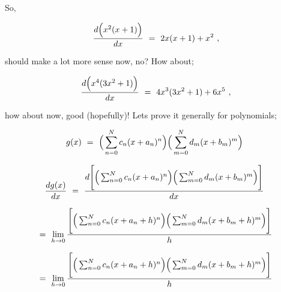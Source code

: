 \documentclass{article}
\begin{document}
So,

\begin{equation} \label{eb-eq-327-1}
\frac{d \Big( x^2(x + 1)\Big)}{dx} \hspace{0.125cm} = \hspace{0.125cm} 2x(x + 1) + x^2 \hspace{0.125cm} ,
\end{equation}

should make a lot more sense now, no? How about;

\begin{equation} \label{eb-eq-327-2}
\frac{d \Big( x^4(3x^2 + 1)\Big)}{dx} \hspace{0.125cm} = \hspace{0.125cm} 4x^3 (3x^2 + 1) + 6 x^5 \hspace{0.125cm} ,
\end{equation}

how about now, good (hopefully)! Lets prove it generally for polynomials;

\begin{equation} \label{eb-eq-328-1}
g(x) \hspace{0.125cm} = \hspace{0.125cm} \Big( \sum_{n=0}^{N} c_n ( x + a_n )^n \Big) \Big( \sum_{m=0}^{N} d_m ( x + b_m )^m \Big) \hspace{0.125cm} 
\end{equation}

\begin{equation} \label{eb-eq-329-1}
\frac{d g(x)}{dx} \hspace{0.125cm} = \hspace{0.125cm} \frac{d \Bigg[ \Big( \sum_{n=0}^{N} c_n ( x + a_n )^n \Big) \Big( \sum_{m=0}^{N} d_m ( x + b_m )^m \Big) \Bigg]}{dx} \hspace{0.125cm} 
\end{equation}

\begin{equation} \label{eb-eq-330-1}
= \hspace{0.125cm} \lim_{h\to0} \frac{\Bigg[ \Big( \sum_{n=0}^{N} c_n ( x + a_n + h)^n \Big) \Big( \sum_{m=0}^{N} d_m ( x + b_m + h)^m \Big) \Bigg]}{h}
\end{equation}

\begin{equation} \label{eb-eq-331-1}
= \hspace{0.125cm} \lim_{h\to0} \frac{\Bigg[ \Big( \sum_{n=0}^{N} c_n ( x + a_n + h)^n \Big) \Big( \sum_{m=0}^{N} d_m ( x + b_m + h)^m \Big) \Bigg]}{h}
\end{equation}
\end{document}

